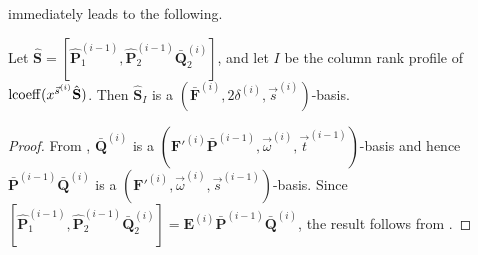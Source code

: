 immediately leads
to the following. 
\begin{lem}
\label{lem:computationAtTopLevel}Let $\hat{\mathbf{S}}=[\hat{\mathbf{P}}_{1}^{\left(i-1\right)},\hat{\mathbf{P}}_{2}^{\left(i-1\right)}\bar{\mathbf{Q}}_{2}^{\left(i\right)}]$,
and let $I$ be the column rank profile of $\operatorname{lcoeff}(x^{\vec{s}^{\left(i\right)}}\hat{\mathbf{S}})$.
Then $\hat{\mathbf{S}}_{I}$ is a $(\bar{\mathbf{F}}^{\left(i\right)},2\delta^{\left(i\right)},\vec{s}^{\left(i\right)})$-basis.\end{lem}
\begin{proof}
From , $\bar{\mathbf{Q}}^{\left(i\right)}$
is a $(\mathbf{F}'^{\left(i\right)}\bar{\mathbf{P}}^{\left(i-1\right)},\vec{\omega}^{\left(i\right)},\vec{t}^{\left(i-1\right)})$-basis
and hence $\bar{\mathbf{P}}^{\left(i-1\right)}\bar{\mathbf{Q}}^{\left(i\right)}$
is a $(\mathbf{F}'^{\left(i\right)},\vec{\omega}^{\left(i\right)},\vec{s}^{\left(i-1\right)})$-basis.
Since $[\hat{\mathbf{P}}_{1}^{\left(i-1\right)},\hat{\mathbf{P}}_{2}^{\left(i-1\right)}\bar{\mathbf{Q}}_{2}^{\left(i\right)}]=\mathbf{E}^{\left(i\right)}\bar{\mathbf{P}}^{\left(i-1\right)}\bar{\mathbf{Q}}^{\left(i\right)}$,
the result follows from . %
\begin{comment}
$=\mathbf{E}^{\left(i\right)}[\bar{\mathbf{P}}_{1}^{\left(i-1\right)},\bar{\mathbf{P}}_{2}^{\left(i-1\right)}\bar{\mathbf{Q}}_{2}^{\left(i\right)}]$ 
\end{comment}
\end{proof}

